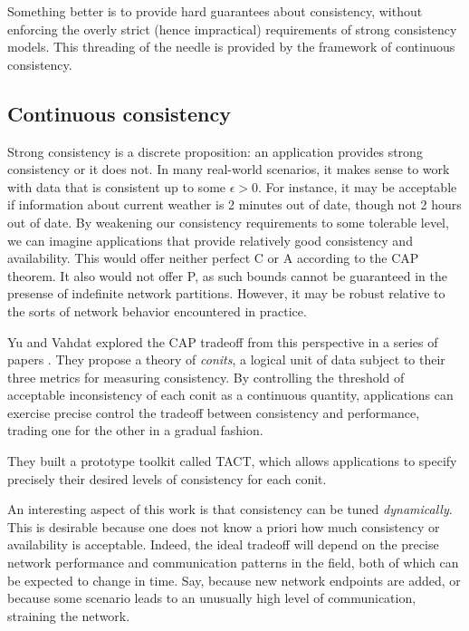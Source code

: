 Something better is to provide hard guarantees about consistency,
without enforcing the overly strict (hence impractical) requirements
of strong consistency models. This threading of the needle is provided
by the framework of continuous consistency.

\subsection{Continuous consistency}
Strong consistency is a discrete proposition: an application provides
strong consistency or it does not. In many real-world scenarios, it
makes sense to work with data that is consistent up to some $\epsilon
> 0$. For instance, it may be acceptable if information about current
weather is 2 minutes out of date, though not 2 hours out of date. By
weakening our consistency requirements to some tolerable level, we can
imagine applications that provide relatively good consistency and
availability. This would offer neither perfect C or A according to the
CAP theorem. It also would not offer P, as such bounds cannot be
guaranteed in the presense of indefinite network partitions. However,
it may be robust relative to the sorts of network behavior encountered
in practice.

Yu and Vahdat explored the CAP tradeoff from this perspective in a
series of papers \cite{2000tact} \cite{2000tactalgorithms}
\cite{10.5555/1251229.1251250} \cite{DBLP:conf/icdcs/YuV01}
\cite{2002tact}. They propose a theory of \emph{conits}, a logical
unit of data subject to their three metrics for measuring
consistency. By controlling the threshold of acceptable inconsistency
of each conit as a continuous quantity, applications can exercise
precise control the tradeoff between consistency and performance,
trading one for the other in a gradual fashion.

They built a prototype toolkit called TACT, which allows applications
to specify precisely their desired levels of consistency for each
conit.

An interesting aspect of this work is that consistency can be tuned
\emph{dynamically}. This is desirable because one does not know a
priori how much consistency or availability is acceptable. Indeed, the
ideal tradeoff will depend on the precise network performance and
communication patterns in the field, both of which can be expected to
change in time. Say, because new network endpoints are added, or
because some scenario leads to an unusually high level of
communication, straining the network.


